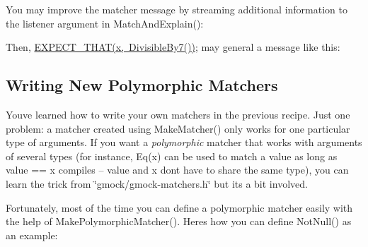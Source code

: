 You may improve the matcher message by streaming additional information to the {\ttfamily listener} argument in {\ttfamily Match\+And\+Explain()}\+:


\begin{DoxyCode}{0}
\DoxyCodeLine{    \}}
\DoxyCodeLine{  \}}
\DoxyCodeLine{\};}
\end{DoxyCode}


Then, {\ttfamily \mbox{\hyperlink{gmock-matchers_8h_ac31e206123aa702e1152bb2735b31409}{E\+X\+P\+E\+C\+T\+\_\+\+T\+H\+A\+T(x, Divisible\+By7())}};} may general a message like this\+: 
\begin{DoxyCode}{0}
\end{DoxyCode}


\subsection*{Writing New Polymorphic Matchers}

You\textquotesingle{}ve learned how to write your own matchers in the previous recipe. Just one problem\+: a matcher created using {\ttfamily Make\+Matcher()} only works for one particular type of arguments. If you want a {\itshape polymorphic} matcher that works with arguments of several types (for instance, {\ttfamily Eq(x)} can be used to match a {\ttfamily value} as long as {\ttfamily value} == {\ttfamily x} compiles -- {\ttfamily value} and {\ttfamily x} don\textquotesingle{}t have to share the same type), you can learn the trick from {\ttfamily \char`\"{}gmock/gmock-\/matchers.\+h\char`\"{}} but it\textquotesingle{}s a bit involved.

Fortunately, most of the time you can define a polymorphic matcher easily with the help of {\ttfamily Make\+Polymorphic\+Matcher()}. Here\textquotesingle{}s how you can define {\ttfamily Not\+Null()} as an example\+:


